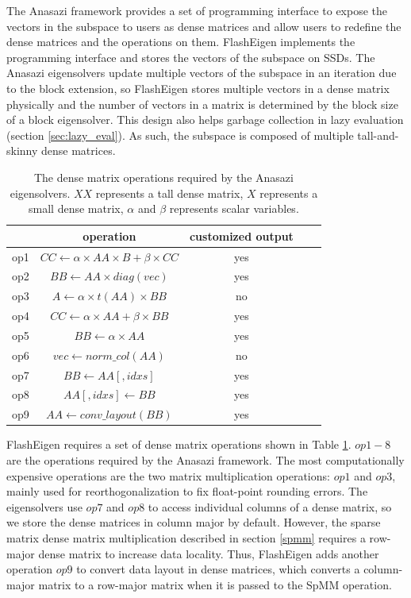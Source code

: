 The Anasazi framework provides a set of programming interface to expose
the vectors in the subspace to users as dense matrices and allow users to
redefine the dense matrices and the operations on them. FlashEigen implements
the programming interface and stores the vectors of the subspace on SSDs.
The Anasazi eigensolvers update multiple vectors of the subspace in an iteration
due to the block extension, so FlashEigen stores multiple vectors in a dense
matrix physically and the number of vectors in a matrix is determined by
the block size of a block eigensolver. This design also helps garbage
collection in lazy evaluation (section \ref{sec:lazy_eval}).
As such, the subspace is composed of multiple tall-and-skinny dense matrices.

\begin{table}
	\begin{center}
		\small
		\begin{tabular}{|c|c|c|c|c|}
			\hline
			& operation & customized output \\
			\hline
			op1 & $CC \leftarrow \alpha \times AA \times B + \beta \times CC$ & yes \\
			\hline
			op2 & $BB \leftarrow AA \times diag(vec)$ & yes \\
			\hline
			op3 & $A \leftarrow \alpha \times t(AA) \times BB$ & no \\
			\hline
			op4 & $CC \leftarrow \alpha \times AA + \beta \times BB$ & yes \\
			\hline
			op5 & $BB \leftarrow \alpha \times AA$ & yes \\
			\hline
			op6 & $vec \leftarrow norm\_col(AA)$ & no \\
			\hline
			op7 & $BB \leftarrow AA[,idxs]$ & yes \\
			\hline
			op8 & $AA[,idxs] \leftarrow BB$ & yes \\
			\hline
			op9 & $AA \leftarrow conv\_layout(BB)$ & yes \\
			\hline
		\end{tabular}
		\normalsize
	\end{center}
	\caption{The dense matrix operations required by the Anasazi eigensolvers.
		$XX$ represents a tall dense matrix, $X$ represents a small dense matrix,
	$\alpha$ and $\beta$ represents scalar variables.}
	\label{anasazi_ops}
\end{table}

FlashEigen requires a set of dense matrix operations shown in Table
\ref{anasazi_ops}. $op1-8$ are the operations required by the Anasazi
framework. The most computationally expensive operations are the two
matrix multiplication operations: $op1$ and $op3$, mainly used for
reorthogonalization to fix float-point rounding errors. The eigensolvers
use $op7$ and $op8$ to access individual columns of a dense matrix,
so we store the dense matrices in column major by default.
However, the sparse matrix dense matrix multiplication described in section
\ref{spmm} requires a row-major dense matrix to increase data locality.
Thus, FlashEigen adds another operation $op9$ to convert data layout
in dense matrices, which converts a column-major matrix to a row-major
matrix when it is passed to the SpMM operation.


